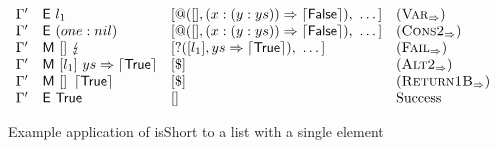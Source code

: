 \begin{figure*}
\[\begin{array}{llll}
            \Gamma'     & \textsf{E}~l_1                                        & [@([],(x : (y : ys)) \Rightarrow \left\lceil \textsf{False}\right\rceil),~\dots]          & (\textsc{Var}_{\Rightarrow})      \\
            \Gamma'     & \textsf{E}~(one : nil)                                   & [@([],(x : (y : ys)) \Rightarrow \left\lceil \textsf{False}\right\rceil),~\dots]          & (\textsc{Cons2}_{\Rightarrow})    \\
            \Gamma'     & \textsf{M}~[]~\lightning                            & [?([l_1],ys \Rightarrow \left\lceil \textsf{True}\right\rceil),~\dots] & (\textsc{Fail}_{\Rightarrow})     \\
            \Gamma'     & \textsf{M}~[l_1]~ys \Rightarrow \left\lceil \textsf{True}\right\rceil            & [\$]                                                         & (\textsc{Alt2}_{\Rightarrow})     \\
            \Gamma'     & \textsf{M}~[]~\left\lceil \textsf{True}\right\rceil                              & [\$]                                                         & (\textsc{Return1B}_{\Rightarrow}) \\
            \Gamma'     & \textsf{E}~\textsf{True}                              & []                                                           & \text{Success}         \\
        \end{array}
    \]
    \caption{Example application of \textsf{isShort} to a list with a single element}\label{ex:isShort}
\end{figure*}